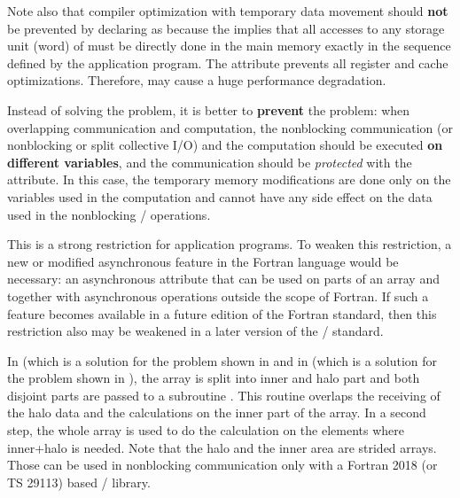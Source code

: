 Note also that compiler optimization with temporary data movement
should \textbf{not} be prevented by declaring  as 
because
the  implies that all accesses to any storage unit (word)
of  must be directly done in the main memory exactly
in the sequence defined by the application program.
The  attribute prevents all register and cache optimizations.
Therefore,  may cause a huge performance degradation.

Instead of solving the problem, it is better to \textbf{prevent} the problem:
when overlapping communication and computation,
the nonblocking communication (or nonblocking or split collective I/O)
and the computation should be executed \textbf{on different variables},
and the communication should be \emph{protected} with the
 attribute.
In this case, the temporary memory modifications are done
only on the variables used in the computation and cannot have any
side effect on the data used in the nonblocking \MPI/ operations.
\begin{rationale}
This is a strong restriction for application programs.
To weaken this restriction, a new or modified asynchronous feature
in the Fortran language would be necessary:
an asynchronous attribute that can be used on parts of an array
and together with asynchronous operations outside the scope of Fortran.
If such a feature becomes available in a future edition of the Fortran standard,
then this restriction also may be weakened in a later version
of the \MPI/ standard.
\end{rationale}

In 
(which is a solution for the problem shown in
and in 
(which is a solution for the problem shown in
),
the array is split into inner and halo
part and both disjoint parts are passed to a subroutine .
This routine overlaps the receiving of the halo data and the calculations
on the inner part of the array.
In a second step, the whole array is used to do
the calculation on the elements where inner+halo is needed.
Note that the halo and the inner area are strided arrays.
Those can be used in nonblocking communication
only with a Fortran 2018 (or TS 29113) based \MPI/ library.


